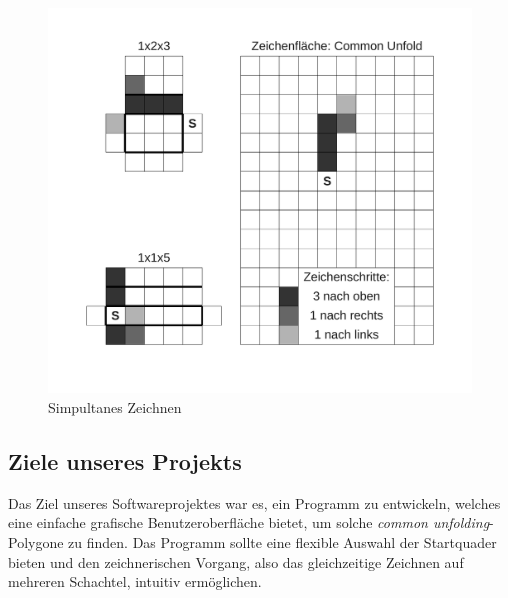 \begin{figure}[htbp]
\centering
\includegraphics[scale=0.5]{03_pics/simulatnes_zeichnen.pdf}
\caption{Simpultanes Zeichnen}
\label{fig:Simpultanes-Zeichnen}
\end{figure}


\subsection{Ziele unseres Projekts}
\label{subsec:ziele}

Das Ziel unseres Softwareprojektes war es, ein Programm zu entwickeln, welches eine einfache grafische Benutzeroberfläche bietet, um solche \emph{common unfolding}-Polygone zu finden. Das Programm sollte eine flexible Auswahl der Startquader bieten und den zeichnerischen Vorgang, also das gleichzeitige Zeichnen auf mehreren Schachtel, intuitiv ermöglichen.

\newpage


